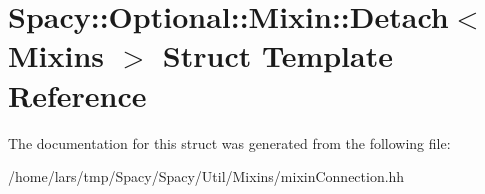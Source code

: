 \hypertarget{structSpacy_1_1Optional_1_1Mixin_1_1Detach}{}\section{Spacy\+:\+:Optional\+:\+:Mixin\+:\+:Detach$<$ Mixins $>$ Struct Template Reference}
\label{structSpacy_1_1Optional_1_1Mixin_1_1Detach}


The documentation for this struct was generated from the following file\+:\begin{DoxyCompactItemize}
\item 
/home/lars/tmp/\+Spacy/\+Spacy/\+Util/\+Mixins/mixin\+Connection.\+hh\end{DoxyCompactItemize}
